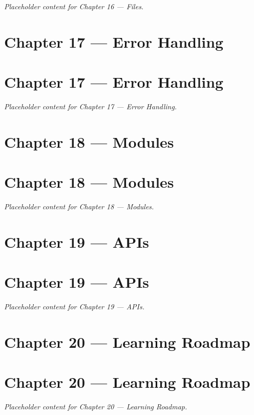 \documentclass[
  letterpaper,
  DIV=11,
  numbers=noendperiod]{scrreprt}
\begin{document}

\emph{Placeholder content for Chapter 16 --- Files.}

\chapter{Chapter 17 --- Error Handling}\label{chapter-17-error-handling}

\chapter*{Chapter 17 --- Error
Handling}\label{chapter-17-error-handling-1}


\emph{Placeholder content for Chapter 17 --- Error Handling.}

\chapter{Chapter 18 --- Modules}\label{chapter-18-modules}

\chapter*{Chapter 18 --- Modules}\label{chapter-18-modules-1}


\emph{Placeholder content for Chapter 18 --- Modules.}

\chapter{Chapter 19 --- APIs}\label{chapter-19-apis}

\chapter*{Chapter 19 --- APIs}\label{chapter-19-apis-1}


\emph{Placeholder content for Chapter 19 --- APIs.}

\chapter{Chapter 20 --- Learning
Roadmap}\label{chapter-20-learning-roadmap}

\chapter*{Chapter 20 --- Learning
Roadmap}\label{chapter-20-learning-roadmap-1}


\emph{Placeholder content for Chapter 20 --- Learning Roadmap.}
\end{document}
